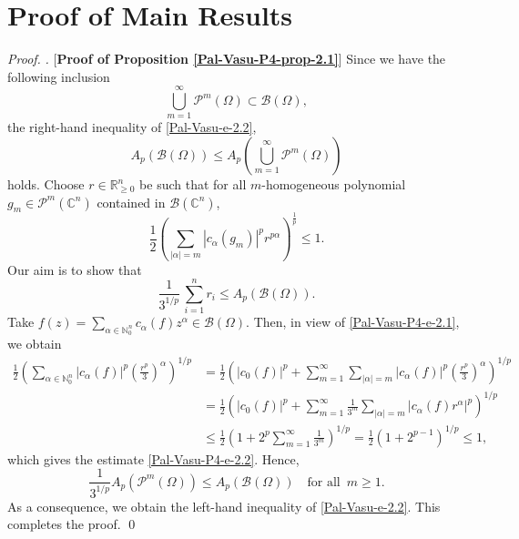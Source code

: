 \documentclass[a4paper,12pt]{amsart}
\theoremstyle{definition}
\newenvironment{pf}[1][]{%
 \vskip 3mm
 \noindent
 \ifthenelse{\equal{#1}{}}%
  {{\slshape Proof. }}%
  {{\slshape #1.} }%
 }%
{\qed\bigskip}
\begin{document}
\section{Proof of Main Results}\label{section-03}
\begin{pf} [{\bf Proof of Proposition \ref{Pal-Vasu-P4-prop-2.1}}]
		Since we have the following inclusion 
	\begin{equation*}
		\bigcup_{m=1}^{\infty} \mathcal{P}^{m}(\Omega) \subset\mathcal{B}(\Omega),
	\end{equation*}
the right-hand inequality of \eqref{Pal-Vasu-e-2.2},
\begin{equation}
	A_p\left(\mathcal{B}(\Omega)\right) \leq A_p\left(\bigcup_{m=1}^{\infty}\mathcal{P}^m(\Omega)\right)
\end{equation}
 holds.
	Choose $r\in \mathbb{R}^n_{\geq 0}$ be such that for all $m$-homogeneous polynomial $g_m \in \mathcal{P}^m(\mathbb{C}^n)$ contained in $\mathcal{B}(\mathbb{C}^n)$,
	\begin{equation}\label{Pal-Vasu-P4-e-2.1}
		\frac{1}{2}\left(\sum_{|\alpha|=m}|c_{\alpha}(g_m)|^pr^{p\alpha}\right)^{\frac{1}{p}}\leq 1.
	\end{equation}
	Our aim is to show that 
	\begin{equation}\label{Pal-Vasu-P4-e-2.2}
		\frac{1}{3^{1/p}}\,\sum_{i=1}^{n}r_i \leq A_p(\mathcal{B}(\Omega)).
	\end{equation}
	Take $f(z)=\sum_{\alpha\in \mathbb{N}^n_{0}}c_{\alpha}(f)z^{\alpha} \in \mathcal{B}(\Omega)$. Then, in view of \eqref{Pal-Vasu-P4-e-2.1}, we obtain
	\begin{align*}
		\frac{1}{2}\left(\sum_{\alpha\in \mathbb{N}^n_{0}}|c_{\alpha}(f)|^p\left(\frac{r^p}{3}\right)^{\alpha}\right)^{1/p} &= \frac{1}{2} \left(|c_0(f)|^p + \sum_{m=1}^{\infty}\sum_{|\alpha|=m}|c_{\alpha}(f)|^p\left(\frac{r^p}{3}\right)^{\alpha}\right)^{1/p}\\ & = \frac{1}{2}\left(|c_0(f)|^p + \sum_{m=1}^{\infty}\frac{1}{3^m}\sum_{|\alpha|=m}|c_{\alpha}(f)r^{\alpha}|^p\right)^{1/p}\\ & \leq \frac{1}{2}\left(1+ 2^p\sum_{m=1}^{\infty}\frac{1}{3^m}\right)^{1/p}=\frac{1}{2}\left(1+2^{p-1}\right)^{1/p}\leq 1,
	\end{align*}
	which gives the estimate \eqref{Pal-Vasu-P4-e-2.2}. Hence, 
	\begin{equation*}
		\frac{1}{3^{1/p}}A_p(\mathcal{P}^m(\Omega))\leq A_p(\mathcal{B}(\Omega)) \quad \mbox{for all}\,\,\, m\geq 1.
	\end{equation*}
	As a consequence, we obtain the left-hand inequality of \eqref{Pal-Vasu-e-2.2}. This completes the proof.
\end{pf}
\end{document}
